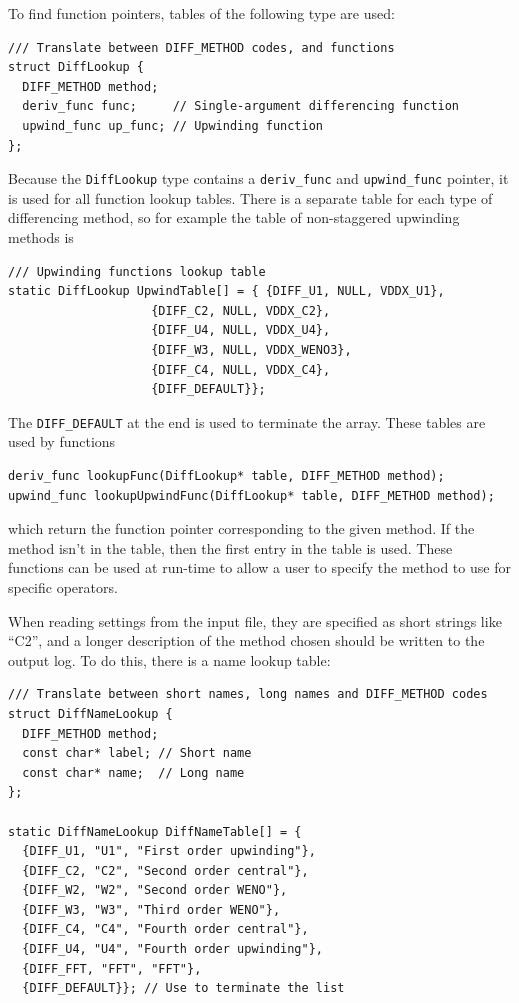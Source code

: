 \documentclass[12pt]{article}
\begin{document}
To find function pointers, tables of the following type are used: 
\begin{lstlisting}
/// Translate between DIFF_METHOD codes, and functions
struct DiffLookup {
  DIFF_METHOD method;
  deriv_func func;     // Single-argument differencing function
  upwind_func up_func; // Upwinding function
};
\end{lstlisting}
Because the \texttt{DiffLookup} type contains a \texttt{deriv\_func} and
\texttt{upwind\_func} pointer, it is used for all function lookup tables. 
There is a separate table for each type of differencing method, so for example
the table of non-staggered upwinding methods is
\begin{lstlisting}
/// Upwinding functions lookup table
static DiffLookup UpwindTable[] = { {DIFF_U1, NULL, VDDX_U1},
				    {DIFF_C2, NULL, VDDX_C2},
				    {DIFF_U4, NULL, VDDX_U4},
				    {DIFF_W3, NULL, VDDX_WENO3},
				    {DIFF_C4, NULL, VDDX_C4},
				    {DIFF_DEFAULT}};
\end{lstlisting}
The \texttt{DIFF\_DEFAULT} at the end is used to terminate the array. 
These tables are used by functions
\begin{lstlisting}
deriv_func lookupFunc(DiffLookup* table, DIFF_METHOD method);
upwind_func lookupUpwindFunc(DiffLookup* table, DIFF_METHOD method);
\end{lstlisting}
which return the function pointer corresponding to the given method. If the
method isn't in the table, then the first entry in the table is used.
These functions can be used at run-time to allow a user to specify the method
to use for specific operators. 

When reading settings from the input file, they are specified as short
strings like ``C2'', and a longer description
of the method chosen should be written to the output log. To do this, 
there is a name lookup table: 
\begin{lstlisting}
/// Translate between short names, long names and DIFF_METHOD codes
struct DiffNameLookup {
  DIFF_METHOD method;
  const char* label; // Short name
  const char* name;  // Long name
};

static DiffNameLookup DiffNameTable[] = { 
  {DIFF_U1, "U1", "First order upwinding"},
  {DIFF_C2, "C2", "Second order central"},
  {DIFF_W2, "W2", "Second order WENO"},
  {DIFF_W3, "W3", "Third order WENO"},
  {DIFF_C4, "C4", "Fourth order central"},
  {DIFF_U4, "U4", "Fourth order upwinding"},
  {DIFF_FFT, "FFT", "FFT"},
  {DIFF_DEFAULT}}; // Use to terminate the list
\end{lstlisting}
\end{document}
